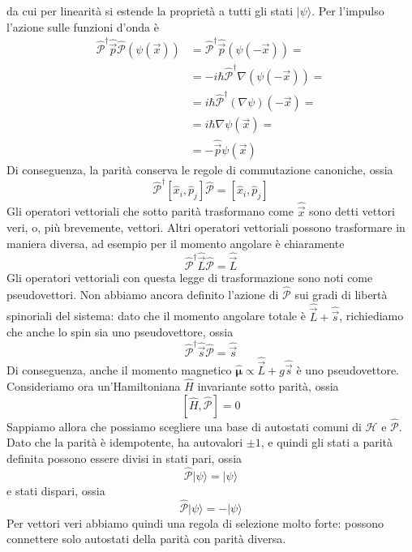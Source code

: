 \documentclass[a4paper, 11pt]{article}
\newcommand{\op}[1]{\hat{#1}}
\renewcommand{\H}{\mathcal{H}}
\renewcommand{\op}[1]{\hat{#1}}
\newcommand{\ham}{\hat{H}}
\renewcommand{\ket}[1]{| #1\rangle}
\renewcommand{\P}{\op{\mathcal{P}}}
\begin{document}
da cui per linearità si estende la proprietà a tutti gli stati $\ket{\psi}$. Per l'impulso l'azione sulle funzioni d'onda è
\begin{align*}
	\P^\dagger\op{\vec{p}}\P(\psi(\vec{x}))&=\P^\dagger\op{\vec{p}}(\psi(-\vec{x}))=\\&=-i\hbar\P^\dagger\nabla(\psi(-\vec{x}))=\\&=i\hbar\P^\dagger(\nabla\psi)(-\vec{x})=\\&=i\hbar\nabla\psi(\vec{x})=\\&=-\op{\vec{p}}\psi(\vec{x})
\end{align*}
Di conseguenza, la parità conserva le regole di commutazione canoniche, ossia
\[\P^\dagger[\op x_i,\op p_j]\P=[\op x_i,\op p_j]\]
Gli operatori vettoriali che sotto parità trasformano come $\op{\vec{x}}$ sono detti vettori veri, o, più brevemente, vettori. Altri operatori vettoriali possono trasformare in maniera diversa, ad esempio per il momento angolare è chiaramente
\[\P^\dagger\op{\vec{L}}\P=\op{\vec{L}}\]
Gli operatori vettoriali con questa legge di trasformazione sono noti come pseudovettori. Non abbiamo ancora definito l'azione di $\P$ sui gradi di libertà spinoriali del sistema: dato che il momento angolare totale è $\op{\vec{L}}+\op{\vec{s}}$, richiediamo che anche lo spin sia uno pseudovettore, ossia
\[\P^\dagger\op{\vec{s}}\P=\op{\vec{s}}\]
Di conseguenza, anche il momento magnetico $\op{\bm{\mu}}\propto\op{\vec{L}}+g\op{\vec{s}}$ è uno pseudovettore. Consideriamo ora un'Hamiltoniana $\ham$ invariante sotto parità, ossia
\[[\ham,\P]=0\]
Sappiamo allora che possiamo scegliere una base di autostati comuni di $\H$ e $\P$. Dato che la parità è idempotente, ha autovalori $\pm1$, e quindi gli stati a parità definita possono essere divisi in stati pari, ossia
\[\P\ket{\psi}=\ket{\psi}\]
e stati dispari, ossia
\[\P\ket{\psi}=-\ket{\psi}\]
Per vettori veri abbiamo quindi una regola di selezione molto forte: possono connettere solo autostati della parità con parità diversa.
\end{document}
